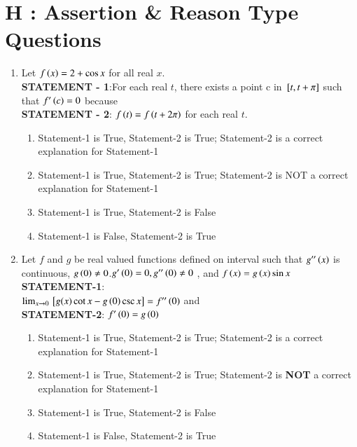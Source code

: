 \documentclass[journal,,12pt,twocolumn]{IEEEtran}
\theoremstyle{remark}
\begin{document}
\section*{H : Assertion \& Reason Type Questions}
\begin{enumerate}
    \item Let $f\left(x\right)=2 + \cos{x}$ for all real $x$.\\
    \textbf{STATEMENT - 1}:For each real $t$, there exists a point c in ${}\left[t,t+\pi\right]$ such that $f'\left(c\right)=0$ because \\
    \textbf{STATEMENT - 2}: $f\left(t\right)=f\left(t+2\pi\right)$ for each real $t$.
    \hfill{}
    \begin{enumerate}
    
        
    
        \item Statement-1 is True, Statement-2 is True; Statement-2 is a correct explanation for Statement-1
        \item Statement-1 is True, Statement-2 is True; Statement-2 is NOT a correct explanation for Statement-1
        \item Statement-1 is True, Statement-2 is False 
        \item Statement-1 is False, Statement-2 is True
        
    \end{enumerate}
\item Let $f$ and $g$ be real valued functions defined on interval  such that $g''\left(x\right)$ is continuous, $g\left(0\right)\neq0$.$g'\left(0\right)=0, g''\left(0\right)\neq0$ , and $f\left(x\right)=g\left(x\right)\sin{x}$\\
\textbf{STATEMENT-1}:\\
$\lim _{x \to 0}{}\left[g(x)\cot{x}-g\left(0\right)\csc{x}\right]=f''\left(0\right)$ and\\
\textbf{STATEMENT-2}: $f'\left(0\right)=g\left(0\right)$
\hfill{}
\begin{enumerate}

    

        \item Statement-1 is True, Statement-2 is True; Statement-2 is a correct explanation for Statement-1
        \item Statement-1 is True, Statement-2 is True; Statement-2 is \textbf{NOT} a correct explanation for Statement-1
        \item Statement-1 is True, Statement-2 is False 
        \item Statement-1 is False, Statement-2 is True
        
    \end{enumerate}
\end{enumerate}
\end{document}
